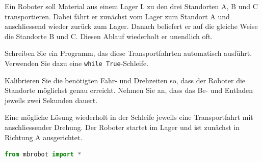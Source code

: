 \begin{myexercise}
    Ein Roboter soll Material aus einem Lager L zu den
    drei Standorten A, B und C transportieren. Dabei
    fährt er zunächst vom Lager zum Standort A und
    anschliessend wieder zurück zum Lager. Danach
    beliefert er auf die gleiche Weise die Standorte
    B und C. Diesen Ablauf wiederholt er unendlich oft.

    \begin{center}
    \end{center}

    Schreiben Sie ein Programm, das diese Transportfahrten
    automatisch ausführt. Verwenden Sie dazu eine
    \texttt{while True}-Schleife.

    Kalibrieren Sie die benötigten Fahr- und Drehzeiten
    so, dass der Roboter die Standorte möglichst genau
    erreicht. Nehmen Sie an, dass das Be- und Entladen
    jeweils zwei Sekunden dauert.

    \begin{myanswer}
        Eine mögliche Lösung wiederholt in der Schleife
        jeweils eine Transportfahrt mit anschliessender Drehung.
        Der Roboter startet im Lager und ist zunächst
        in Richtung A ausgerichtet.

        \begin{lstlisting}[language=Python]
from mbrobot import *


\end{lstlisting}
\end{myanswer}
\end{myexercise}
